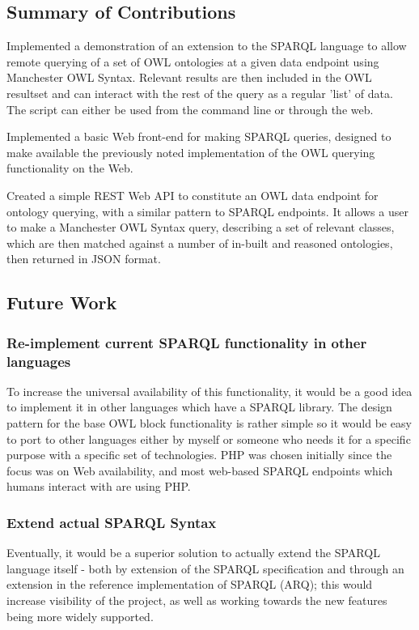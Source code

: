 \documentclass{article}
\begin{document}
\subsection{Summary of Contributions}

Implemented a demonstration of an extension to the SPARQL language to allow
remote querying of a set of OWL ontologies at
a given data endpoint using Manchester OWL Syntax. Relevant results are then
included in the OWL resultset and can
interact with the rest of the query as a regular 'list' of data. The script can
either be used from the command line or
through the web.

Implemented a basic Web front-end for making SPARQL queries, designed to make
available the previously noted implementation of
the OWL querying functionality on the Web.

Created a simple REST Web API to constitute an OWL data endpoint for ontology
querying, with a similar pattern to SPARQL
endpoints. It allows a user to make a Manchester OWL Syntax query, describing a
set of relevant classes, which are then
matched against a number of in-built and reasoned ontologies, then returned in
JSON format.

\subsection{Future Work}

\subsubsection{Re-implement current SPARQL functionality in other languages}

To increase the universal availability of this functionality, it would be a good
idea to implement it in other languages which
have a SPARQL library. The design pattern for the base OWL block functionality
is rather simple so it would be easy to port
to other languages either by myself or someone who needs it for a specific
purpose with a specific set of technologies. PHP
was chosen initially since the focus was on Web availability, and most web-based
SPARQL endpoints which humans interact with
are using PHP.

\subsubsection{Extend actual SPARQL Syntax}

Eventually, it would be a superior solution to actually extend the SPARQL
language itself - both by extension of the SPARQL
specification and through an extension in the reference implementation of SPARQL
(ARQ); this would increase visibility of the
project, as well as working towards the new features being more widely
supported.
\end{document}
